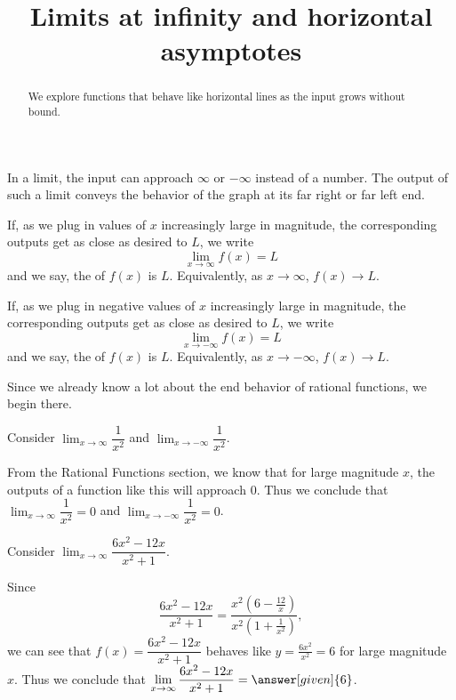 \documentclass{ximera}
\title{Limits at infinity and horizontal asymptotes}
\begin{document}
\begin{abstract}
We explore functions that behave like horizontal lines as the input
grows without bound.
\end{abstract}
\maketitle

In a limit, the input can approach $\infty$ or $-\infty$ instead of a number. The output of such a limit conveys the behavior of the graph at its far right or far left end.

\begin{definition}\label{def:limitAtInfty}
If, as we plug in values of $x$ increasingly large in magnitude, the corresponding outputs get as close as desired to $L$, we write
\[
\lim_{x\to \infty} f(x) = L
\]
and we say, the  of $f(x)$ is $L$. Equivalently, as $x\rightarrow\infty$, $f(x)\rightarrow L$.

If, as we plug in negative values of $x$ increasingly large in magnitude, the corresponding outputs get as close as desired to $L$, we write
\[
\lim_{x\to -\infty} f(x) = L
\]
and we say, the  of $f(x)$ is $L$. Equivalently, as $x\rightarrow -\infty$, $f(x)\rightarrow L$. 
\end{definition}

Since we already know a lot about the end behavior of rational functions, we begin there.

\begin{example}
	Consider $\displaystyle\lim_{x\rightarrow\infty}\dfrac{1}{x^2}$ and $\displaystyle\lim_{x\rightarrow -\infty}\dfrac{1}{x^2}$.
	\begin{explanation}
		From the Rational Functions section, we know that for large magnitude $x$, the outputs of a function like this will approach $0$. Thus we conclude that $\displaystyle\lim_{x\rightarrow\infty}\dfrac{1}{x^2}=0$ and $\displaystyle\lim_{x\rightarrow -\infty}\dfrac{1}{x^2}=0$.
	\end{explanation}
\end{example}

\begin{example}
	Consider $\displaystyle\lim_{x\rightarrow\infty}\dfrac{6x^2-12x}{x^2+1}$.
  \begin{explanation} Since $$\dfrac{6x^2-12x}{x^2+1}=\dfrac{x^2(6-\frac{12}{x})}{x^2(1+\frac{1}{x^2})},$$ we can see that $f(x)=\dfrac{6x^2-12x}{x^2+1}$ behaves like $y=\frac{6x^2}{x^2}=6$ for large magnitude $x$. Thus we conclude that $\displaystyle\lim_{x\rightarrow\infty}\dfrac{6x^2-12x}{x^2+1}=\answer[given]{6}$.
  \end{explanation}
\end{example}
\end{document}
